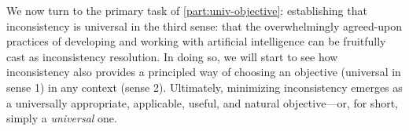 
We now turn to the primary task of \cref{part:univ-objective}: establishing that inconsistency is universal in the third sense: that the overwhelmingly agreed-upon practices of developing and working with artificial intelligence can be fruitfully cast as inconsistency resolution. 
In doing so, we will start to see how inconsistency also provides a principled way of choosing an objective (universal in sense 1) in any context (sense 2).
Ultimately, minimizing inconsistency emerges as a universally appropriate, applicable, useful, and natural objective---or, for short, simply a \emph{universal} one. 




%
